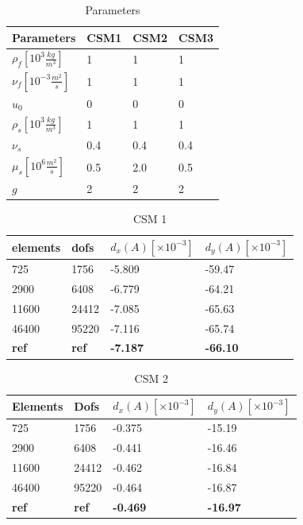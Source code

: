 \begin{table}[H]
\centering
\caption{Parameters}
\label{my-label}
\begin{tabular}{|l|l|l|l|}
\hline
Parameters & CSM1 & CSM2 & CSM3 \\ \hline
$\rho_f[10^3 \frac{kg}{m^3}]$ & 1 & 1 & 1 \\ \hline
$\nu_f [10^{-3} \frac{m^2}{s}]$ & 1 & 1 & 1 \\ \hline
$u_0$ & 0 & 0 & 0 \\ \hline
$\rho_s[10^3 \frac{kg}{m^3}]$ & 1 & 1 & 1 \\ \hline
$\nu_s$ & 0.4 & 0.4 & 0.4 \\ \hline
$\mu_s[10^6 \frac{m^2}{s}]$ & 0.5 & 2.0 & 0.5 \\ \hline
$g $ & 2 & 2 & 2 \\ \hline
\end{tabular}
\end{table}

\begin{table}[H]
\centering
\caption{CSM 1}
\label{my-label}
\begin{tabular}{|l|l|l|l|}
\hline
elements & dofs & $d_x(A) [\times10^{-3}]$ & $d_y(A) [\times10^{-3}]$ \\ \hline
725 & 1756 & -5.809 & -59.47 \\ \hline
2900 & 6408 & -6.779 & -64.21 \\ \hline
11600 & 24412 & -7.085 & -65.63 \\ \hline
46400 & 95220 & -7.116 & -65.74 \\ \hline
\textbf{ref} & \textbf{ref} & \textbf{-7.187} &  \textbf{-66.10} \\ \hline
\end{tabular}
\end{table}

\begin{table}[H]
\centering
\caption{CSM 2}
\label{my-label}
\begin{tabular}{@{}|l|l|l|l|@{}}
\hline
Elements & Dofs & $d_x(A) [\times10^{-3}] $& $d_y(A) [\times10^{-3}] $\\ \hline
725 &  1756 & -0.375 & -15.19 \\ \hline
2900 & 6408 & -0.441 & -16.46\\ \hline
11600 & 24412 & -0.462 & -16.84 \\ \hline
46400 & 95220 & -0.464 & -16.87\\ \hline
\textbf{ref} & \textbf{ref} &  \textbf{-0.469} &  \textbf{-16.97} \\ \hline
\end{tabular}
\end{table}

